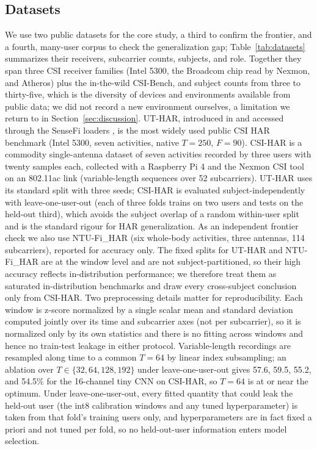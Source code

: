 \documentclass{ieeeaccess}
\begin{document}
\subsection{Datasets}
We use two public datasets for the core study, a third to confirm the frontier, and a fourth, many-user corpus to check the generalization gap; Table~\ref{tab:datasets} summarizes their receivers, subcarrier counts, subjects, and role. Together they span three CSI receiver families (Intel 5300, the Broadcom chip read by Nexmon, and Atheros) plus the in-the-wild CSI-Bench, and subject counts from three to thirty-five, which is the diversity of devices and environments available from public data; we did not record a new environment ourselves, a limitation we return to in Section~\ref{sec:discussion}. UT-HAR, introduced in \cite{yousefi2017uthar} and accessed through the SenseFi loaders \cite{yang2023sensefi}, is the most widely used public CSI HAR benchmark (Intel 5300, seven activities, native $T=250$, $F=90$). CSI-HAR \cite{csihardataset} is a commodity single-antenna dataset of seven activities recorded by three users with twenty samples each, collected with a Raspberry Pi 4 and the Nexmon CSI tool on an 802.11ac link (variable-length sequences over 52 subcarriers). UT-HAR uses its standard split with three seeds; CSI-HAR is evaluated subject-independently with leave-one-user-out (each of three folds trains on two users and tests on the held-out third), which avoids the subject overlap of a random within-user split and is the standard rigour for HAR generalization. As an independent frontier check we also use NTU-Fi\_HAR \cite{yang2023sensefi} (six whole-body activities, three antennas, 114 subcarriers), reported for accuracy only. The fixed splits for UT-HAR and NTU-Fi\_HAR are at the window level and are not subject-partitioned, so their high accuracy reflects in-distribution performance; we therefore treat them as saturated in-distribution benchmarks and draw every cross-subject conclusion only from CSI-HAR. Two preprocessing details matter for reproducibility. Each window is z-score normalized by a single scalar mean and standard deviation computed jointly over its time and subcarrier axes (not per subcarrier), so it is normalized only by its own statistics and there is no fitting across windows and hence no train-test leakage in either protocol. Variable-length recordings are resampled along time to a common $T=64$ by linear index subsampling; an ablation over $T\in\{32,64,128,192\}$ under leave-one-user-out gives 57.6, 59.5, 55.2, and 54.5\% for the 16-channel tiny CNN on CSI-HAR, so $T=64$ is at or near the optimum. Under leave-one-user-out, every fitted quantity that could leak the held-out user (the int8 calibration windows and any tuned hyperparameter) is taken from that fold's training users only, and hyperparameters are in fact fixed a priori and not tuned per fold, so no held-out-user information enters model selection.
\end{document}

